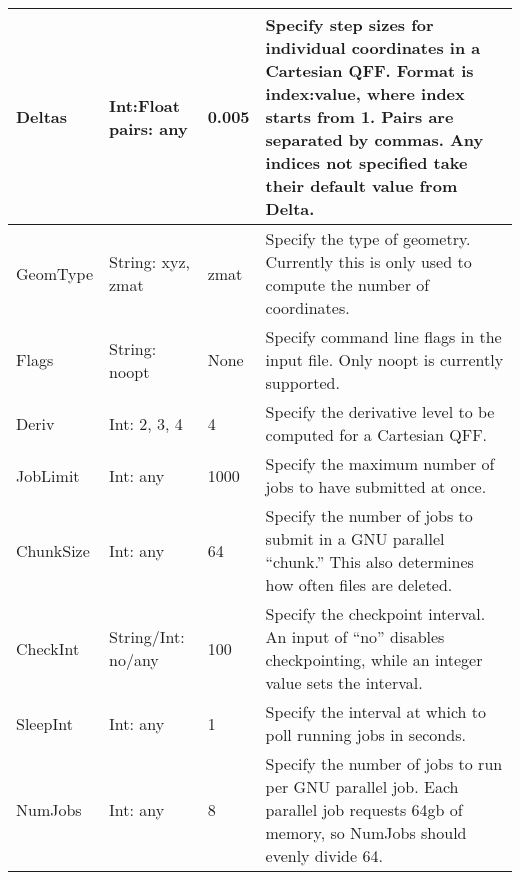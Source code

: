 \documentclass{article}
\begin{document}
\begin{table}[ht]
\begin{tabular}{|l|>{\raggedright}p{}|l|p{}|}
    \hline
    Deltas                        & Int:Float pairs: any & 0.005 & Specify step sizes for individual coordinates
                                                                   in a Cartesian QFF.
                                                                   Format is index:value, where index starts from 1.
                                                                   Pairs are separated by commas. Any indices not
                                                                   specified take their default value from Delta.\\
    \hline
    GeomType                      & String: xyz, zmat & zmat & Specify the type of geometry.
                                                               Currently this is only used to
                                                               compute the number of coordinates.\\
    \hline
    Flags                         & String: noopt & None & Specify command line flags in the input file.
                                                           Only noopt is currently supported.\\
    \hline
    Deriv                         & Int: 2, 3, 4 & 4 & Specify the derivative level to be computed for a Cartesian QFF.\\
    \hline
    JobLimit                      & Int: any & 1000 & Specify the maximum number of jobs to have submitted at once.\\
    \hline
    ChunkSize                     & Int: any & 64 & Specify the number of jobs to submit in a GNU parallel ``chunk.''
                                                    This also determines how often files are deleted.\\
    \hline
    CheckInt                      & String/Int: no/any & 100 & Specify the checkpoint interval. An input of ``no''
                                                               disables checkpointing, while an integer value sets
                                                               the interval.\\
    \hline
    SleepInt                      & Int: any & 1 & Specify the interval at which to poll running jobs in seconds.\\
    \hline
    NumJobs                       & Int: any & 8 & Specify the number of jobs to run per GNU parallel job.
                                                   Each parallel job requests 64gb of memory, so NumJobs
                                                   should evenly divide 64.\\

\end{tabular}
\end{table}
\end{document}

